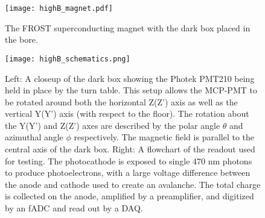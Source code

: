\begin{figure}[ht]
	\centering
	\texttt{[image: highB\_magnet.pdf]}
	\caption{The FROST superconducting magnet with the dark box placed in the bore.}
	\label{fig:highB_magnet}
\end{figure}

\begin{figure}[ht]
	\centering
	\texttt{[image: highB\_schematics.png]}
	\caption{Left: A closeup of the dark box showing the Photek PMT210 being held in place by the turn table. This setup allows the MCP-PMT to be rotated around both the horizontal Z(Z') axis as well as the vertical Y(Y') axis (with respect to the floor). The rotation about the Y(Y') and Z(Z') axes are described by the polar angle $\theta$ and azimuthal angle $\phi$ respectively. The magnetic field is parallel to the central axis of the dark box. Right: A flowchart of the readout used for testing. The photocathode is exposed to single 470 nm photons to produce photoelectrons, with a large voltage difference between the anode and cathode used to create an avalanche. The total charge is collected on the anode, amplified by a preamplifier, and digitized by an fADC and read out by a DAQ. \cite{HighB_DIRC2015} }
	\label{fig:highB_schematics}
\end{figure}